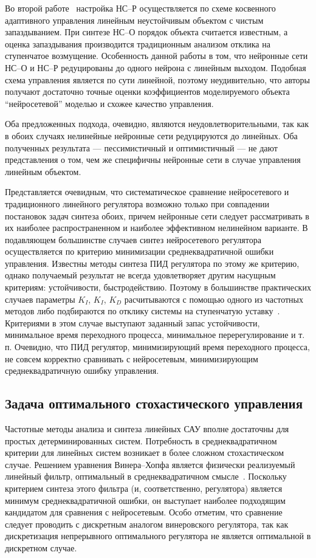 Во второй работе~\cite{toudeft} настройка НС--Р осуществляется по
схеме косвенного адаптивного управления линейным неустойчивым объектом
с чистым запаздыванием.  При синтезе НС--О порядок объекта считается
известным, а оценка запаздывания производится традиционным анализом
отклика на ступенчатое возмущение.  Особенность данной работы в том,
что нейронные сети НС--О и НС--Р редуцированы до одного нейрона с
линейным выходом.  Подобная схема управления является по сути
линейной, поэтому неудивительно, что авторы получают достаточно точные
оценки коэффициентов моделируемого объекта ``нейросетевой'' моделью и
схожее качество управления.

Оба предложенных подхода, очевидно, являются неудовлетворительными,
так как в обоих случаях нелинейные нейронные сети редуцируются до
линейных.  Оба полученных результата --- пессимистичный и
оптимистичный --- не дают представления о том, чем же специфичны
нейронные сети в случае управления линейным объектом.

Представляется очевидным, что систематическое сравнение нейросетевого
и традиционного линейного регулятора возможно только при совпадении
постановок задач синтеза обоих, причем нейронные сети следует
рассматривать в их наиболее распространенном и наиболее эффективном
нелинейном варианте.  В подавляющем большинстве случаев синтез
нейросетевого регулятора осуществляется по критерию минимизации
среднеквадратичной ошибки управления.  Известны методы синтеза ПИД
регулятора по этому же критерию, однако получаемый результат не всегда
удовлетворяет другим насущным критериям: устойчивости, быстродействию.
Поэтому в большинстве практических случаев параметры $K_I$, $K_I$,
$K_D$ расчитываются с помощью одного из частотных методов либо
подбираются по отклику системы на ступенчатую
уставку~\cite{kurop73}\cite{netush68}.  Критериями в этом случае
выступают заданный запас устойчивости, минимальное время переходного
процесса, минимальное перерегулирование и т. п.  Очевидно, что ПИД
регулятор, минимизирующий время переходного процесса, не совсем
корректно сравнивать с нейросетевым, минимизирующим среднеквадратичную
ошибку управления.

\subsection{Задача оптимального стохастического управления}

Частотные методы анализа и синтеза линейных САУ вполне достаточны для
простых детерминированных систем.  Потребность в среднеквадратичном
критерии для линейных систем возникает в более сложном стохастическом
случае.  Решением уравнения Винера--Хопфа является физически
реализуемый линейный фильтр, оптимальный в среднеквадратичном
смысле~\cite{solod60}\cite{skliar65}\cite{ostrem73}\cite{tsipkin58}.
Поскольку критерием синтеза этого фильтра (и, соответственно,
регулятора) является минимум среднеквадратичной ошибки, он выступает
наиболее подходящим кандидатом для сравнения с нейросетевым.  Особо
отметим, что сравнение следует проводить с дискретным аналогом
винеровского регулятора, так как дискретизация непрерывного
оптимального регулятора не является оптимальной в дискретном случае.

